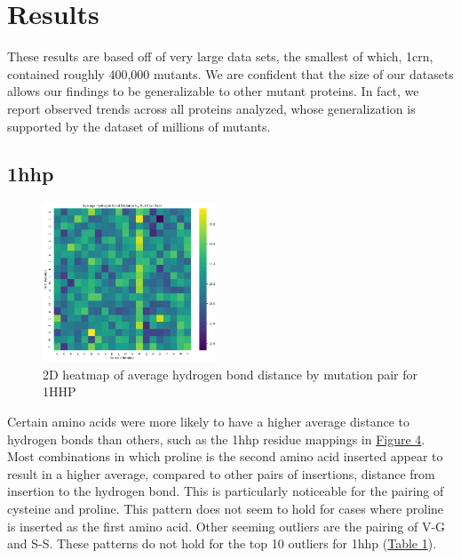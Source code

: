 \documentclass[sigconf, screen, authorversion, authoraddress=false, oneside]{acmart}
\begin{document}



\section{Results}
These results are based off of very large data sets, the smallest of which, 1crn, contained roughly 400,000 mutants. We are confident that the size of our datasets allows our findings to be generalizable to other mutant proteins. In fact, we report observed trends across all proteins analyzed, whose generalization is supported by the dataset of millions of mutants.


\subsection{1hhp}
\begin{figure}[!ht]
    \centering
    \includegraphics[width=0.46\textwidth]{residue_to_distance.png} 
    \caption{2D heatmap of average hydrogen bond distance by mutation pair 
 for 1HHP}
    \label{fig:Figure4}
\end{figure}



Certain amino acids were more likely to have a higher average distance to hydrogen bonds than others, such as the 1hhp residue mappings in \hyperref[fig:Figure4]{Figure 4}. Most combinations in which proline is the second amino acid inserted appear to result in a higher average, compared to other pairs of insertions, distance from insertion to the hydrogen bond. This is particularly noticeable for the pairing of cysteine and proline. This pattern does not seem to hold for cases where proline is inserted as the first amino acid. Other seeming outliers are the pairing of V-G and S-S. These patterns do not hold for the top 10 outliers for 1hhp (\hyperref[table:1]{Table 1}). 
\end{document}
